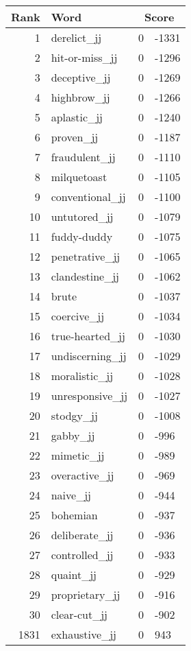 \begin{longtable}[!htbp]{| rlr@{.}l |}
    \hline
    \textbf{Rank} & \textbf{Word} & \multicolumn{2}{c|}{\textbf{Score}} \\
    \hline
    \endhead
    1 & derelict\_jj & 0 & -1331 \\
    2 & hit-or-miss\_jj & 0 & -1296 \\
    3 & deceptive\_jj & 0 & -1269 \\
    4 & highbrow\_jj & 0 & -1266 \\
    5 & aplastic\_jj & 0 & -1240 \\
    6 & proven\_jj & 0 & -1187 \\
    7 & fraudulent\_jj & 0 & -1110 \\
    8 & milquetoast & 0 & -1105 \\
    9 & conventional\_jj & 0 & -1100 \\
    10 & untutored\_jj & 0 & -1079 \\
    11 & fuddy-duddy & 0 & -1075 \\
    12 & penetrative\_jj & 0 & -1065 \\
    13 & clandestine\_jj & 0 & -1062 \\
    14 & brute & 0 & -1037 \\
    15 & coercive\_jj & 0 & -1034 \\
    16 & true-hearted\_jj & 0 & -1030 \\
    17 & undiscerning\_jj & 0 & -1029 \\
    18 & moralistic\_jj & 0 & -1028 \\
    19 & unresponsive\_jj & 0 & -1027 \\
    20 & stodgy\_jj & 0 & -1008 \\
    21 & gabby\_jj & 0 & -996 \\
    22 & mimetic\_jj & 0 & -989 \\
    23 & overactive\_jj & 0 & -969 \\
    24 & naive\_jj & 0 & -944 \\
    25 & bohemian & 0 & -937 \\
    26 & deliberate\_jj & 0 & -936 \\
    27 & controlled\_jj & 0 & -933 \\
    28 & quaint\_jj & 0 & -929 \\
    29 & proprietary\_jj & 0 & -916 \\
    30 & clear-cut\_jj & 0 & -902 \\
    1831 & exhaustive\_jj & 0 & 943 \\

\end{longtable}
